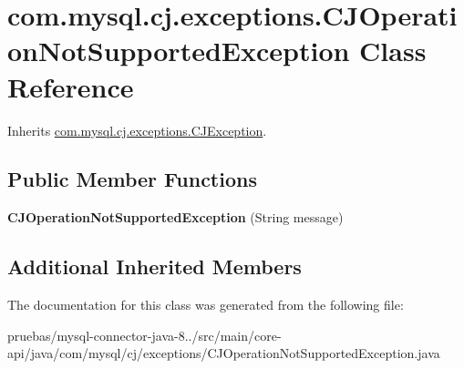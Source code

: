 \hypertarget{classcom_1_1mysql_1_1cj_1_1exceptions_1_1_c_j_operation_not_supported_exception}{}\section{com.\+mysql.\+cj.\+exceptions.\+C\+J\+Operation\+Not\+Supported\+Exception Class Reference}
\label{classcom_1_1mysql_1_1cj_1_1exceptions_1_1_c_j_operation_not_supported_exception}


Inherits \mbox{\hyperlink{classcom_1_1mysql_1_1cj_1_1exceptions_1_1_c_j_exception}{com.\+mysql.\+cj.\+exceptions.\+C\+J\+Exception}}.

\subsection*{Public Member Functions}
\begin{DoxyCompactItemize}
\item 
\mbox{\label{classcom_1_1mysql_1_1cj_1_1exceptions_1_1_c_j_operation_not_supported_exception_a14e5456561ad21542cfce871cbe41307}} 
{\bfseries C\+J\+Operation\+Not\+Supported\+Exception} (String message)
\end{DoxyCompactItemize}
\subsection*{Additional Inherited Members}


The documentation for this class was generated from the following file\+:\begin{DoxyCompactItemize}
\item 
pruebas/mysql-\/connector-\/java-\/8../src/main/core-\/api/java/com/mysql/cj/exceptions/C\+J\+Operation\+Not\+Supported\+Exception.\+java\end{DoxyCompactItemize}
